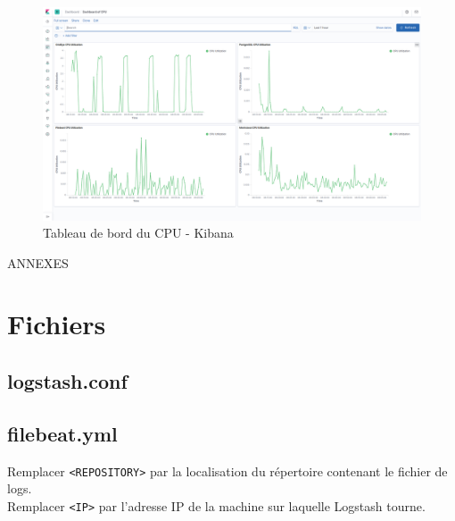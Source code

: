 \documentclass[paper=a4, fontsize=11pt]{scrartcl}
\begin{document}
\begin{figure}[H]
    \centering
    \includegraphics[width=18cm]{img/screenshots/dashboardOfCPU.png}
    \caption{Tableau de bord du CPU - Kibana}
    \label{f-dashboardOfCPU}
\end{figure}

\newpage

\thispagestyle{empty}
\centering
\vspace{10cm}
{\huge ANNEXES}

\newpage

\appendix
{}

\justify

\listoftables
\newpage

\listoffigures
\newpage

\printbibliography

\newpage

\section{Fichiers}

\subsection{logstash.conf}
\label{appendix:logstashConf}


\subsection{filebeat.yml}
\label{appendix:filebeatConf}

Remplacer \verb,<REPOSITORY>, par la localisation du répertoire contenant le fichier de logs.\\
Remplacer \verb,<IP>, par l'adresse IP de la machine sur laquelle Logstash tourne.
\end{document}
